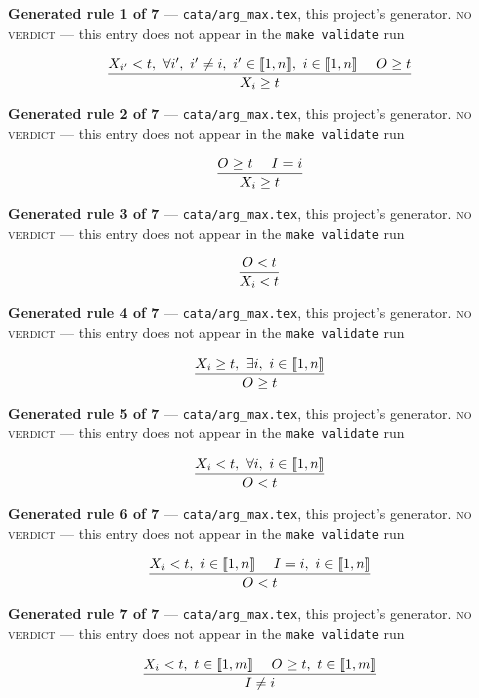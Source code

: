\documentclass[10pt,a4paper]{article}
\newcommand{\rulebox}[1]{%
  \[\resizebox{\ifdim\width>\linewidth\linewidth\else\width\fi}{!}%
    {$\displaystyle #1$}\]}
\begin{document}
{\small\textbf{Generated rule 1 of 7} --- \texttt{cata/arg\_max.tex}, this project's generator. \textsc{no verdict} --- this entry does not appear in the \texttt{make validate} run\par}
\rulebox{\frac{X_{i'}<t,~\forall i',~i' \neq i,~i' \in \llbracket1,n\rrbracket,~i \in \llbracket1,n\rrbracket~~~~O_{} \geq t}{X_{i} \geq t}}

{\small\textbf{Generated rule 2 of 7} --- \texttt{cata/arg\_max.tex}, this project's generator. \textsc{no verdict} --- this entry does not appear in the \texttt{make validate} run\par}
\rulebox{\frac{O_{} \geq t~~~~I=i}{X_{i} \geq t}}

{\small\textbf{Generated rule 3 of 7} --- \texttt{cata/arg\_max.tex}, this project's generator. \textsc{no verdict} --- this entry does not appear in the \texttt{make validate} run\par}
\rulebox{\frac{O_{}<t}{X_{i}<t}}

{\small\textbf{Generated rule 4 of 7} --- \texttt{cata/arg\_max.tex}, this project's generator. \textsc{no verdict} --- this entry does not appear in the \texttt{make validate} run\par}
\rulebox{\frac{X_{i} \geq t,~\exists i,~i \in \llbracket1,n\rrbracket}{O_{} \geq t}}

{\small\textbf{Generated rule 5 of 7} --- \texttt{cata/arg\_max.tex}, this project's generator. \textsc{no verdict} --- this entry does not appear in the \texttt{make validate} run\par}
\rulebox{\frac{X_{i}<t,~\forall i,~i \in \llbracket1,n\rrbracket}{O_{}<t}}

{\small\textbf{Generated rule 6 of 7} --- \texttt{cata/arg\_max.tex}, this project's generator. \textsc{no verdict} --- this entry does not appear in the \texttt{make validate} run\par}
\rulebox{\frac{X_{i}<t,~i \in \llbracket1,n\rrbracket~~~~I=i,~i \in \llbracket1,n\rrbracket}{O_{}<t}}

{\small\textbf{Generated rule 7 of 7} --- \texttt{cata/arg\_max.tex}, this project's generator. \textsc{no verdict} --- this entry does not appear in the \texttt{make validate} run\par}
\rulebox{\frac{X_{i}<t,~t \in \llbracket1,m\rrbracket~~~~O_{} \geq t,~t \in \llbracket1,m\rrbracket}{I \neq i}}
\end{document}
